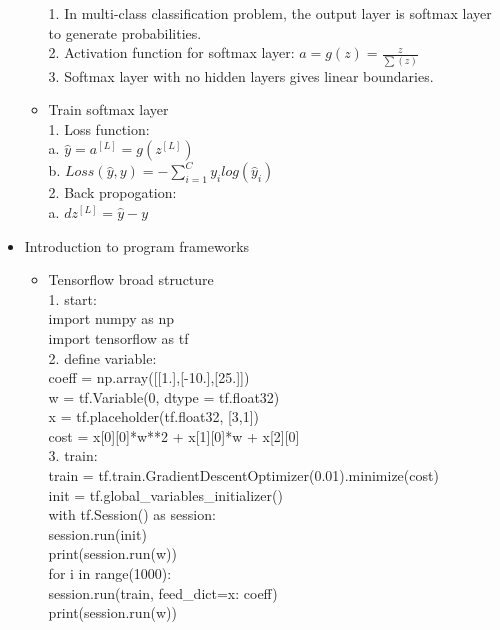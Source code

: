 \begin{itemize}
\begin{itemize}
1. In multi-class classification problem, the output layer is softmax layer to generate probabilities.\\
2. Activation function for softmax layer: $a = g(z) = \frac{z}{\sum(z)}$\\
3. Softmax layer with no hidden layers gives linear boundaries.
        \item Train softmax layer\\
1. Loss function: \\
\tab a. $\hat{y} = a^{[L]} = g(z^{[L]})$\\
\tab b. $Loss(\hat{y},y) = -\sum_{i=1}^{C}y_{i}log(\hat{y}_{i})$\\
2. Back propogation:\\
\tab a. $dz^{[L]} = \hat{y} - y$\\
    \end{itemize}
    \item{Introduction to program frameworks} 
    \begin{itemize}
        \item Tensorflow broad structure\\
1. start: \\
\tab import numpy as np\\
\tab import tensorflow as tf\\
2. define variable:\\
\tab coeff = np.array([[1.],[-10.],[25.]])\\
\tab w = tf.Variable(0, dtype = tf.float32)\\
\tab x = tf.placeholder(tf.float32, [3,1])\\
\tab cost = x[0][0]*w**2 + x[1][0]*w + x[2][0]\\
3. train:\\
\tab train = tf.train.GradientDescentOptimizer(0.01).minimize(cost)\\
\tab init = tf.global\_variables\_initializer()\\
\tab with tf.Session() as session:\\
\tab\tab session.run(init)\\
\tab\tab print(session.run(w))\\
\tab for i in range(1000):\\
\tab\tab session.run(train, feed\_dict={x: coeff})\\
\tab print(session.run(w))\\
    \end{itemize}
\end{itemize}    
    

